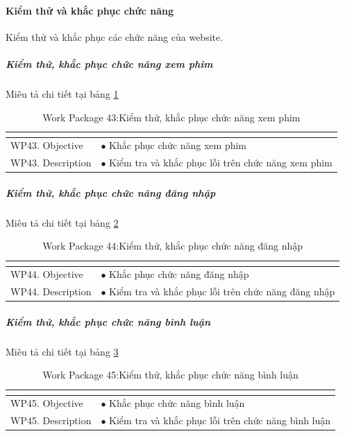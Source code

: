 \documentclass[a4paper]{book}
\begin{document}
\paragraph{Kiểm thử và khắc phục chức năng} Kiểm thử và khắc phục các chức năng của website.
\subparagraph{Kiểm thử, khắc phục chức năng xem phim} Miêu tả chi tiết tại bảng \ref{table:kt_kp_chucnang_xemphim}
\begin{table}[h!]
	\begin{center}
		\begin{tabular}{|p{4cm}|p{10cm}|}
			\hline
			\multicolumn{2}{|c|}{\cellcolor[HTML]{363636}{\color[HTML]{FFFFFF}Work package 43: Kiểm thử, khắc phục chức năng xem phim}}\\
			\hline
			\multirow{1}{*}{WP43. Objective} & $\bullet$ Khắc phục chức năng xem phim\\
			\hline
			\multirow{1}{*}{WP43. Description} & $\bullet$ Kiểm tra và khắc phục lỗi trên chức năng xem phim \\
			\hline
		\end{tabular}
		\caption{Work Package 43:Kiểm thử, khắc phục chức năng xem phim}
		\label{table:kt_kp_chucnang_xemphim}
	\end{center}
\end{table}
\subparagraph{Kiểm thử, khắc phục chức năng đăng nhập}Miêu tả chi tiết tại bảng \ref{table:kt_kp_chucnang_dangnhap}
\begin{table}[h!]
	\begin{center}
		\begin{tabular}{|p{4cm}|p{10cm}|}
			\hline
			\multicolumn{2}{|c|}{\cellcolor[HTML]{363636}{\color[HTML]{FFFFFF}Work package 44: Kiểm thử, khắc phục chức năng đăng nhập}}\\
			\hline
			\multirow{1}{*}{WP44. Objective} & $\bullet$ Khắc phục chức năng đăng nhập\\
			\hline
			\multirow{1}{*}{WP44. Description} & $\bullet$ Kiểm tra và khắc phục lỗi trên chức năng đăng nhập \\
			\hline
		\end{tabular}
		\caption{Work Package 44:Kiểm thử, khắc phục chức năng đăng nhập}
		\label{table:kt_kp_chucnang_dangnhap}
	\end{center}
\end{table}
\subparagraph{Kiểm thử, khắc phục chức năng bình luận} Miêu tả chi tiết tại bảng \ref{table:kt_kp_chucnang_binhluan}
\begin{table}[h!]
	\begin{center}
		\begin{tabular}{|p{4cm}|p{10cm}|}
			\hline
			\multicolumn{2}{|c|}{\cellcolor[HTML]{363636}{\color[HTML]{FFFFFF}Work package 45: Kiểm thử, khắc phục chức năng bình luận}}\\
			\hline
			\multirow{1}{*}{WP45. Objective} & $\bullet$ Khắc phục chức năng bình luận\\
			\hline
			\multirow{1}{*}{WP45. Description} & $\bullet$ Kiểm tra và khắc phục lỗi trên chức năng bình luận \\
			\hline
		\end{tabular}
		\caption{Work Package 45:Kiểm thử, khắc phục chức năng bình luận}
		\label{table:kt_kp_chucnang_binhluan}
	\end{center}
\end{table}
\end{document}
